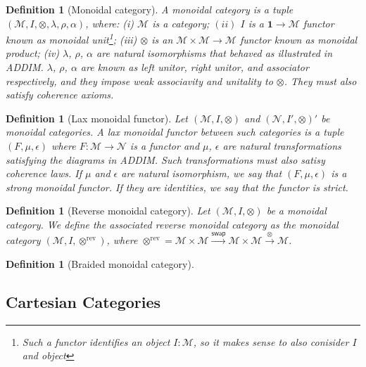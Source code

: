 \documentclass[12pt,a4paper,openright,twoside]{report}
\theoremstyle{plain}
\newtheorem{definition}[proposition]{Definition}
\theoremstyle{definition}
\begin{document}
\begin{definition}[Monoidal category]
  A monoidal category is a tuple \\$(\mathcal{M}, I, \otimes, \lambda, \rho, \alpha)$, where: (i) $\mathcal{M}$ is a category; $(ii)$ $I$ is a $\mathbf{1} \to \mathcal{M}$ functor known as monoidal unit\footnote{Such a functor identifies an object $I : \mathcal{M}$, so it makes sense to also conisider $I$ and object}; (iii) $\otimes$ is an $\mathcal{M} \times \mathcal{M} \to \mathcal{M}$ functor known as monoidal product; (iv) $\lambda$, $\rho$, $\alpha$ are natural isomorphisms that behaved as illustrated in ADDIM. $\lambda$, $\rho$, $\alpha$ are known as left unitor, right unitor, and associator respectively, and they impose weak associavity and unitality to $\otimes$. They must also satisfy coherence axioms.
\end{definition}

\begin{definition}[Lax monoidal functor]
  Let $(\mathcal{M}, I, \otimes)$ and $(\mathcal{N}, I', \otimes)'$ be monoidal categories. A lax monoidal functor between such categories is a tuple $(F, \mu, \epsilon)$ where $F: \mathcal{M} \to \mathcal{N}$ is a functor and $\mu$, $\epsilon$ are natural transformations satisfying the diagrams in ADDIM. Such transformations must also satisy coherence laws. If $\mu$ and $\epsilon$ are natural isomorphism, we say that $(F, \mu, \epsilon)$ is a strong monoidal functor. If they are identities, we say that the functor is strict.
\end{definition}

\begin{definition}[Reverse monoidal category]
  Let $(\mathcal{M}, I, \otimes)$ be a monoidal category. We define the associated reverse monoidal category as the monoidal category $(\mathcal{M}, I, \otimes^{\mathrm{rev}})$, where $\otimes^{\mathrm{rev}} = \mathcal{M} \times \mathcal{M} \stackrel{\mathsf{swap}}{\rightarrow} \mathcal{M} \times \mathcal{M} \stackrel{\otimes}{\rightarrow} \mathcal{M}$.
\end{definition}

\begin{definition}[Braided monoidal category]
  
\end{definition}


\subsection{Cartesian Categories}
\end{document}
